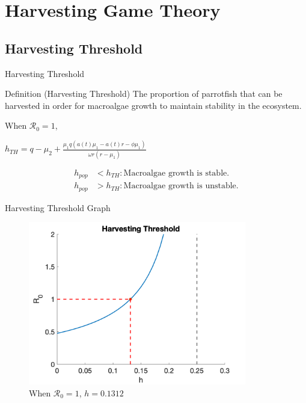 \documentclass{beamer}
\begin{document}
\section{Harvesting Game Theory}


\subsection{Harvesting Threshold}
\begin{frame}{Harvesting Threshold}
    \begin{block}{Definition (Harvesting Threshold)}
        The proportion of parrotfish that can be harvested in order for macroalgae growth to maintain stability in the ecosystem. 
    \end{block}
    
    \vspace{0.5cm}
    
    When $\mathscr{R}_{0} = 1$,
    \begin{center}
    
    $\displaystyle{h_{TH} = q - \mu_{2} + \frac{\mu_{1}q(a(t) \mu_{1} - a(t)r - \phi \mu_{1})}{\omega r(r-\mu_{1})}}$ \\
    \end{center}
    \begin{align*}
    h_{pop} &< h_{TH}: \text{Macroalgae growth is stable.} \\
    h_{pop} &> h_{TH}: \text{Macroalgae growth is unstable.}
    \end{align*}
\end{frame}

\begin{frame}{Harvesting Threshold Graph}
    \begin{figure}
        \centering
        \includegraphics[width = 0.85\textwidth]{Latex/Figures/Graphs/threshold_graph.png}
        \caption{When $\mathscr{R}_0 = 1$, $h = 0.1312$}
        \label{fig:threshold}
    \end{figure}
\end{frame}
\end{document}
